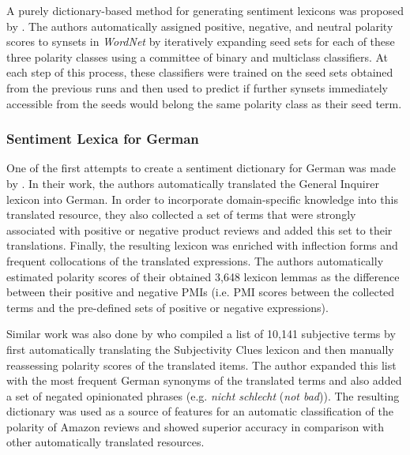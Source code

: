 
A purely dictionary-based method for generating sentiment lexicons was
proposed by \citet{Esuli:06b}.  The authors automatically assigned
positive, negative, and neutral polarity scores to synsets in
\emph{WordNet} by iteratively expanding seed sets for each of these
three polarity classes using a committee of binary and multiclass
classifiers.  At each step of this process, these classifiers were
trained on the seed sets obtained from the previous runs and then used
to predict if further synsets immediately accessible from the seeds
would belong the same polarity class as their seed term.

\subsubsection{Sentiment Lexica for German}

One of the first attempts to create a sentiment dictionary for German
was made by \citet{Remus:10}.  In their work, the authors
automatically translated the General Inquirer lexicon \cite{Stone:66}
into German.  In order to incorporate domain-specific knowledge into
this translated resource, they also collected a set of terms that were
strongly associated with positive or negative product reviews and
added this set to their translations.  Finally, the resulting lexicon
was enriched with inflection forms and frequent collocations of the
translated expressions.  The authors automatically estimated polarity
scores of their obtained 3,648 lexicon lemmas as the difference
between their positive and negative PMIs (i.e. PMI scores between the
collected terms and the pre-defined sets of positive or negative
expressions).

Similar work was also done by \citet{Waltinger:10} who compiled a list
of 10,141 subjective terms by first automatically translating the
Subjectivity Clues lexicon \cite{Wilson:05} and then manually
reassessing polarity scores of the translated items.  The author
expanded this list with the most frequent German synonyms of the
translated terms and also added a set of negated opinionated phrases
(e.g. \emph{nicht schlecht} (\emph{not bad})).  The resulting
dictionary was used as a source of features for an automatic
classification of the polarity of Amazon reviews and showed superior
accuracy in comparison with other automatically translated resources.

